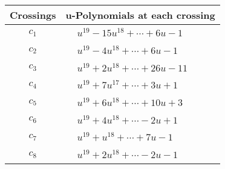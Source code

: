 \documentclass[1p]{elsarticle_modified}
\theoremstyle{definition}
\begin{document}
\begin{tabular}{m{50pt}|m{274pt}}
Crossings & \hspace{64pt}u-Polynomials at each crossing \\
\hline $$\begin{aligned}c_{1}\end{aligned}$$&$\begin{aligned}
&u^{19}-15 u^{18}+\cdots+6 u-1
\end{aligned}$\\
\hline $$\begin{aligned}c_{2}\end{aligned}$$&$\begin{aligned}
&u^{19}-4 u^{18}+\cdots+6 u-1
\end{aligned}$\\
\hline $$\begin{aligned}c_{3}\end{aligned}$$&$\begin{aligned}
&u^{19}+2 u^{18}+\cdots+26 u-11
\end{aligned}$\\
\hline $$\begin{aligned}c_{4}\end{aligned}$$&$\begin{aligned}
&u^{19}+7 u^{17}+\cdots+3 u+1
\end{aligned}$\\
\hline $$\begin{aligned}c_{5}\end{aligned}$$&$\begin{aligned}
&u^{19}+6 u^{18}+\cdots+10 u+3
\end{aligned}$\\
\hline $$\begin{aligned}c_{6}\end{aligned}$$&$\begin{aligned}
&u^{19}+4 u^{18}+\cdots-2 u+1
\end{aligned}$\\
\hline $$\begin{aligned}c_{7}\end{aligned}$$&$\begin{aligned}
&u^{19}+u^{18}+\cdots+7 u-1
\end{aligned}$\\
\hline $$\begin{aligned}c_{8}\end{aligned}$$&$\begin{aligned}
&u^{19}+2 u^{18}+\cdots-2 u-1
\end{aligned}$\\

\end{tabular}
\end{document}
